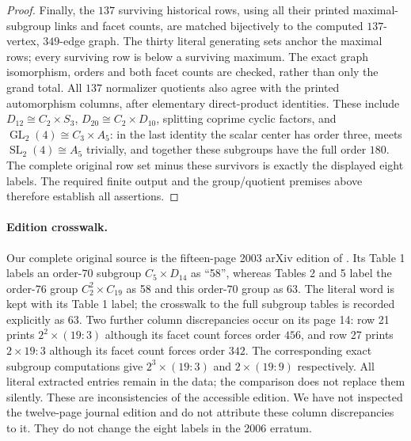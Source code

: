 \documentclass[11pt,a4paper]{article}
\begin{document}
\begin{proof}
Finally, the $137$ surviving historical rows, using all their printed maximal-subgroup links and facet counts, are matched bijectively to the computed $137$-vertex, $349$-edge graph. The thirty literal generating sets anchor the maximal rows; every surviving row is below a surviving maximum. The exact graph isomorphism, orders and both facet counts are checked, rather than only the grand total. All $137$ normalizer quotients also agree with the printed automorphism columns, after elementary direct-product identities. These include $D_{12}\cong C_2\times S_3$, $D_{20}\cong C_2\times D_{10}$, splitting coprime cyclic factors, and $\operatorname{GL}_2(4)\cong C_3\times A_5$: in the last identity the scalar center has order three, meets $\operatorname{SL}_2(4)\cong A_5$ trivially, and together these subgroups have the full order $180$. The complete original row set minus these survivors is exactly the displayed eight labels. The required finite output and the group/quotient premises above therefore establish all assertions.
\end{proof}

\paragraph{Edition crosswalk.}
Our complete original source is the fifteen-page 2003 arXiv edition of \cite{original}. Its Table 1 labels an order-$70$ subgroup $C_5\times D_{14}$ as ``58'', whereas Tables 2 and 5 label the order-$76$ group $C_2^2\times C_{19}$ as 58 and this order-$70$ group as 63. The literal word is kept with its Table 1 label; the crosswalk to the full subgroup tables is recorded explicitly as 63. Two further column discrepancies occur on its page 14: row 21 prints $2^2\times(19:3)$ although its facet count forces order $456$, and row 27 prints $2\times19:3$ although its facet count forces order $342$. The corresponding exact subgroup computations give $2^3\times(19:3)$ and $2\times(19:9)$ respectively. All literal extracted entries remain in the data; the comparison does not replace them silently. These are inconsistencies of the accessible edition. We have not inspected the twelve-page journal edition and do not attribute these column discrepancies to it. They do not change the eight labels in the 2006 erratum.
\end{document}
